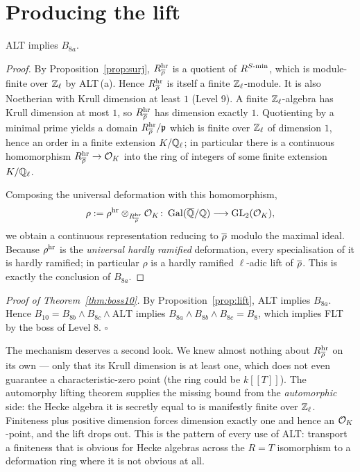 \documentclass[11pt]{article}
\begin{document}
\section{Producing the lift}

\begin{proposition}\label{prop:lift}
ALT implies $B_{8a}$.
\end{proposition}

\begin{proof}
By Proposition~\ref{prop:surj}, $R^{\mathrm{hr}}_{\overline{\rho}}$ is a quotient of
$R^{S\text{-}\mathrm{min}}$, which is module-finite over $\mathbb{Z}_\ell$ by ALT\,(a). Hence
$R^{\mathrm{hr}}_{\overline{\rho}}$ is itself a finite $\mathbb{Z}_\ell$-module. It is also Noetherian with
Krull dimension at least $1$ (Level 9). A finite $\mathbb{Z}_\ell$-algebra has Krull
dimension at most $1$, so $R^{\mathrm{hr}}_{\overline{\rho}}$ has dimension exactly $1$.
Quotienting by a minimal prime yields a domain $R^{\mathrm{hr}}_{\overline{\rho}}/\mathfrak p$
which is finite over $\mathbb{Z}_\ell$ of dimension $1$, hence an order in a finite
extension $K/\mathbb{Q}_\ell$; in particular there is a continuous homomorphism
$R^{\mathrm{hr}}_{\overline{\rho}}\to\mathcal{O}_K$ into the ring of integers of some finite extension
$K/\mathbb{Q}_\ell$.

Composing the universal deformation with this homomorphism,
\[
  \rho:=\rho^{\mathrm{hr}}\otimes_{R^{\mathrm{hr}}_{\overline{\rho}}}\mathcal{O}_K
   \colon\operatorname{Gal}(\overline{\mathbb{Q}}/\mathbb{Q})\longrightarrow\operatorname{GL}_2(\mathcal{O}_K),
\]
we obtain a continuous representation reducing to $\overline{\rho}$ modulo the maximal
ideal. Because $\rho^{\mathrm{hr}}$ is the \emph{universal hardly ramified}
deformation, every specialisation of it is hardly ramified; in particular
$\rho$ is a hardly ramified $\ell$-adic lift of $\overline{\rho}$. This is exactly the
conclusion of $B_{8a}$.
\end{proof}

\noindent\emph{Proof of Theorem~\ref{thm:boss10}.} By
Proposition~\ref{prop:lift}, ALT implies $B_{8a}$. Hence
$B_{10}=B_{8b}\wedge B_{8c}\wedge\text{ALT}$ implies
$B_{8a}\wedge B_{8b}\wedge B_{8c}=B_8$, which implies FLT by the boss of Level
8. \hfill$\square$

\begin{remark}
The mechanism deserves a second look. We knew almost nothing about
$R^{\mathrm{hr}}_{\overline{\rho}}$ on its own --- only that its Krull dimension is at least
one, which does not even guarantee a characteristic-zero point (the ring could
be $k[[T]]$). The automorphy lifting theorem supplies the missing bound from the
\emph{automorphic} side: the Hecke algebra it is secretly equal to is
manifestly finite over $\mathbb{Z}_\ell$. Finiteness plus positive dimension forces
dimension exactly one and hence an $\mathcal{O}_K$-point, and the lift drops out. This
is the pattern of every use of ALT: transport a finiteness that is obvious for
Hecke algebras across the $R=T$ isomorphism to a deformation ring where it is
not obvious at all.
\end{remark}
\end{document}
